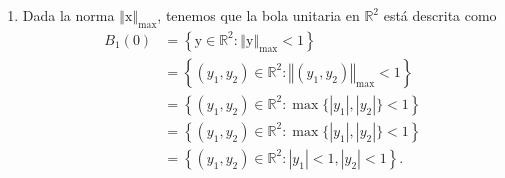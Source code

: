 \documentclass[12pt]{article}
\newcommand{\abs}[1]{\left\vert#1\right\vert}
\newcommand{\norm}[1]{\left\Vert#1\right\Vert}
\newcommand{\R}{\mathbb R}
\newcommand{\x}{\mathrm x}
\newcommand{\y}{\mathrm y}
\newcommand{\z}{\mathrm z}
\begin{document}
\begin{enumerate}
\begin{enumerate}[(1)]
    
    Respecto a $\norm{\x}_1$, sabemos que de las propiedades del valor absoluto, $\abs{x_i}\geq 0$
    para todo $i$ en $\{1,\dots,n\}$. En consecuencia,
    \[
    \norm{\x}_1 = \sum_{i=1}^{n}\abs{x_i} \geq 0. \tag{3}
    \]
    Para probar que $\norm{\x}_1=0$ si y solo si $\x=0$, procederemos por contradicción. Supongamos que existe $\y=(y_1,\ldots,y_n) \in \R^n$ tal que $\norm{\y}_1=0$, y satisface que existe $k \in \{1,\ldots,n\}$
    con $y_k\neq 0$. En consecuencia, $\abs{y_k}>0$, y por dicha razón, la suma en (3) es estrictamente positiva, lo cual es una contradicción, obteniendo así el resultado. Tomemos $\lambda$ como antes. Así,
    \begin{align*}
        \norm{\lambda\x}_1 &= \sum_{i=1}^{n}\abs{\lambda x_i} \\
        &= \sum_{i=1}^{n}\abs{\lambda}\abs{x_i} \\
        &= \abs{\lambda}\sum_{i=1}^{n}\abs{x_i} \\
        &= \abs{\lambda}\norm{\x}_1.
    \end{align*}
    Nuevamente, tomemos el vector $Z$. Luego, por propiedades del valor absoluto, tenemos que $\abs{x_i+z_i}\leq \abs{x_i}+\abs{z_i}$ para todo $i \in \{1,\ldots,n\}$. De ello, afirmamos que
    \begin{align*}
       \norm{\x-\z}_1 &= \sum_{i=1}^{n}\abs{x_i-z_i} \\
       &\leq \sum_{i=1}^{n}\left(\abs{x_i} + \abs{z_i}\right) \\
       &=\sum_{i=1}^{n}\abs{x_i} + \sum_{i=1}^{n}\abs{z_i} \\
       &=\norm{\x}_1 + \norm{\z}_1,
    \end{align*}
    de lo cual se colige que $\norm{\x}_1$ también es norma de $\R^n$.

    \item Dada la norma $\norm{\x}_{\max}$, tenemos que la bola unitaria en $\R^2$ está descrita como
    \begin{align*}
        B_1(0) &= \left\{\y\in\R^2:\norm{\y}_{\max} < 1 \right\} \\
        &= \left\{(y_1,y_2)\in\R^2:\norm{(y_1,y_2)}_{\max} < 1 \right\} \\
        &= \left\{(y_1,y_2)\in\R^2:\max\{\abs{y_1},\abs{y_2}\} < 1 \right\} \\
        &= \left\{(y_1,y_2)\in\R^2:\max\{\abs{y_1},\abs{y_2}\} < 1 \right\} \\
        &= \left\{(y_1,y_2)\in\R^2:\abs{y_1} < 1,\abs{y_2} < 1 \right\}.
    \end{align*}


\end{enumerate}
\end{enumerate}
\end{document}
